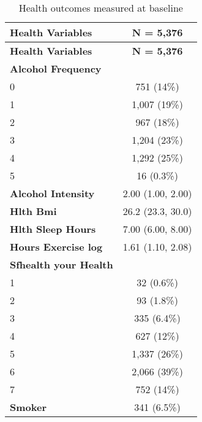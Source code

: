 \documentclass[
  singlecolumn,
  9pt]{article}
\begin{document}
\hypertarget{tbl-table_health_vars_cats}{}
\begin{longtable}[]{@{}lc@{}}
\caption{\label{tbl-table_health_vars_cats}Health outcomes measured at
baseline}\tabularnewline
\toprule\noalign{}
\textbf{Health Variables} & \textbf{N = 5,376} \\
\midrule\noalign{}
\endfirsthead
\toprule\noalign{}
\textbf{Health Variables} & \textbf{N = 5,376} \\
\midrule\noalign{}
\endhead
\bottomrule\noalign{}
\endlastfoot
\textbf{Alcohol Frequency} & \\
0 & 751 (14\%) \\
1 & 1,007 (19\%) \\
2 & 967 (18\%) \\
3 & 1,204 (23\%) \\
4 & 1,292 (25\%) \\
5 & 16 (0.3\%) \\
\textbf{Alcohol Intensity} & 2.00 (1.00, 2.00) \\
\textbf{Hlth Bmi} & 26.2 (23.3, 30.0) \\
\textbf{Hlth Sleep Hours} & 7.00 (6.00, 8.00) \\
\textbf{Hours Exercise log} & 1.61 (1.10, 2.08) \\
\textbf{Sfhealth your Health} & \\
1 & 32 (0.6\%) \\
2 & 93 (1.8\%) \\
3 & 335 (6.4\%) \\
4 & 627 (12\%) \\
5 & 1,337 (26\%) \\
6 & 2,066 (39\%) \\
7 & 752 (14\%) \\
\textbf{Smoker} & 341 (6.5\%) \\
\end{longtable}
\end{document}
